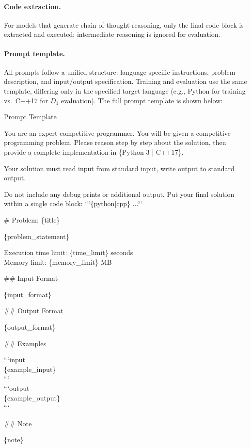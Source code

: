 \documentclass[]{bytedance_seed}
\theoremstyle{plain}
\theoremstyle{definition}
\theoremstyle{remark}
\begin{document}
\paragraph{Code extraction.}
For models that generate chain-of-thought reasoning, only the final code block is extracted and executed; intermediate reasoning is ignored for evaluation.

\paragraph{Prompt template.}
All prompts follow a unified structure: language-specific instructions, problem description, and input/output specification. Training and evaluation use the same template, differing only in the specified target language (e.g., Python for training vs.\ C++17 for $D_1$ evaluation). The full prompt template is shown below:

\begin{problembox}{Prompt Template}
\ttfamily\small\raggedright
You are an expert competitive programmer. You will be given a competitive programming problem. Please reason step by step about the solution, then provide a complete implementation in \{Python 3 | C++17\}.

Your solution must read input from standard input, write output to standard output.

Do not include any debug prints or additional output. Put your final solution within a single code block: ```\{python|cpp\} ...```

\vspace{1mm}
\# Problem: \{title\}

\{problem\_statement\}

Execution time limit: \{time\_limit\} seconds\\
Memory limit: \{memory\_limit\} MB

\#\# Input Format

\{input\_format\}

\#\# Output Format

\{output\_format\}

\#\# Examples

```input\\
\{example\_input\}\\
```\\
```output\\
\{example\_output\}\\
```

\#\# Note

\{note\}
\end{problembox}
\end{document}

